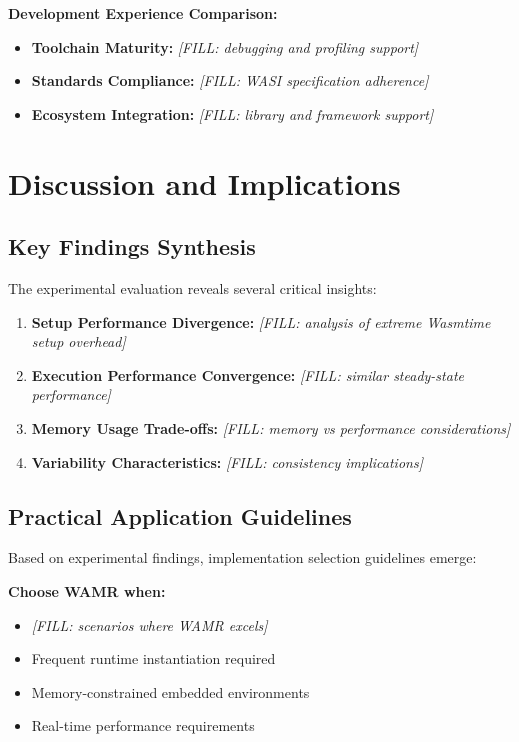\textbf{Development Experience Comparison:}
\begin{itemize}
    \item \textbf{Toolchain Maturity:} \textit{[FILL: debugging and profiling support]}
    \item \textbf{Standards Compliance:} \textit{[FILL: WASI specification adherence]}
    \item \textbf{Ecosystem Integration:} \textit{[FILL: library and framework support]}
\end{itemize}

\section{Discussion and Implications}
\label{sec:discussion-implications}

\subsection{Key Findings Synthesis}
\label{subsec:key-findings}

The experimental evaluation reveals several critical insights:

\begin{enumerate}
    \item \textbf{Setup Performance Divergence:} \textit{[FILL: analysis of extreme Wasmtime setup overhead]}
    \item \textbf{Execution Performance Convergence:} \textit{[FILL: similar steady-state performance]}
    \item \textbf{Memory Usage Trade-offs:} \textit{[FILL: memory vs performance considerations]}
    \item \textbf{Variability Characteristics:} \textit{[FILL: consistency implications]}
\end{enumerate}

\subsection{Practical Application Guidelines}
\label{subsec:application-guidelines}

Based on experimental findings, implementation selection guidelines emerge:

\textbf{Choose WAMR when:}
\begin{itemize}
    \item \textit{[FILL: scenarios where WAMR excels]}
    \item Frequent runtime instantiation required
    \item Memory-constrained embedded environments
    \item Real-time performance requirements
\end{itemize}

